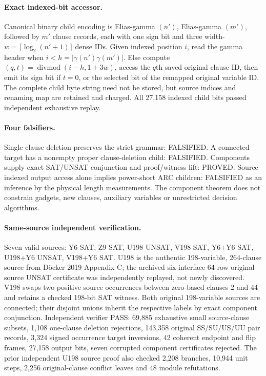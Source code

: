 \documentclass[11pt]{article}
\begin{document}
\paragraph{Exact indexed-bit accessor.} Canonical binary child encoding is Elias-gamma $(n')$, Elias-gamma $(m')$, followed by $m'$ clause records, each with one sign bit and three width-$w=\lceil\log_2(n'+1)\rceil$ dense IDs. Given indexed position $i$, read the gamma header when $i<h=|\gamma(n')\gamma(m')|$. Else compute $(q,t)=\operatorname{divmod}(i-h,1+3w)$, access the $q$th saved original clause ID, then emit its sign bit if $t=0$, or the selected bit of the remapped original variable ID. The complete child byte string need not be stored, but source indices and renaming map are retained and charged. All 27,158 indexed child bits passed independent exhaustive replay.
\paragraph{Four falsifiers.} Single-clause deletion preserves the strict grammar: FALSIFIED. A connected target has a nonempty proper clause-deletion child: FALSIFIED. Components supply exact SAT/UNSAT conjunction and proof/witness lift: PROVED. Source-indexed output access alone implies power-short ARC children: FALSIFIED as an inference by the physical length measurements. The component theorem does not constrain gadgets, new clauses, auxiliary variables or unrestricted decision algorithms.
\paragraph{Same-source independent verification.} Seven valid sources: Y6 SAT, Z9 SAT, U198 UNSAT, V198 SAT, Y6+Y6 SAT, U198+Y6 UNSAT, V198+Y6 SAT. U198 is the authentic 198-variable, 264-clause source from D\"ocker 2019 Appendix C; the archived six-interface 64-row original-source UNSAT certificate was independently replayed, not newly discovered. V198 swaps two positive source occurrences between zero-based clauses 2 and 44 and retains a checked 198-bit SAT witness. Both original 198-variable sources are connected; their disjoint unions inherit the respective labels by exact component conjunction. Independent verifier PASS: 69,885 exhaustive small source-clause subsets, 1,108 one-clause deletion rejections, 143,358 original SS/SU/US/UU pair records, 3,324 signed occurrence target inversions, 42 coherent endpoint and flip frames, 27,158 output bits, seven corrupted component certificates rejected. The prior independent U198 source proof also checked 2,208 branches, 10,944 unit steps, 2,256 original-clause conflict leaves and 48 module refutations.
\end{document}
